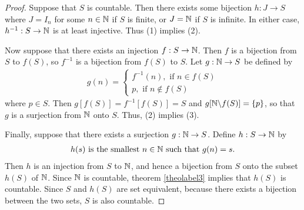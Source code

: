\begin{proof}
	Suppose that $S$ is countable. Then there exists some bijection $h:J\rightarrow S$ where $J=I_n$ for some $n\in \mathbb{N}$ if $S$ is finite, or $J=\mathbb{N}$ if $S$ is infinite. In either case, $h^{-1}:S\rightarrow \mathbb{N}$ is at least injective. Thus (1) implies (2). 
	
	Now suppose that there exists an injection $f:S\rightarrow \mathbb{N}$. Then $f$ is a bijection from $S$ to $f(S)$, so $f^{-1}$ is a bijection from $f(S)$ to $S$. Let $g:\mathbb{N}\rightarrow S$ be defined by
	\begin{align*}
		g(n) = \begin{cases}
			f^{-1}(n), \text{ if $n\in f(S)$} \\
			p, \text{ if $n\notin f(S)$}
		\end{cases}
	\end{align*}
	where $p\in S$. Then $g[f(S)]=f^{-1}[f(S)]=S$ and $g[\mathbb{N}\backslash f(S)]=\{p\}$, so that $g$ is a surjection from $\mathbb{N}$ onto $S$. Thus, (2) implies (3).
	
	Finally, suppose that there exists a surjection $g:\mathbb{N}\rightarrow S$. Define $h:S\rightarrow \mathbb{N}$ by
	\begin{align*}
		h(s) \text{ is the smallest $n\in \mathbb{N}$ such that $g(n)=s$.}
	\end{align*}
	Then $h$ is an injection from $S$ to $\mathbb{N}$, and hence a bijection from $S$ onto the subset $h(S)$ of $\mathbb{N}$. Since $\mathbb{N}$ is countable, theorem \ref{theolabel3} implies that $h(S)$ is countable. Since $S$ and $h(S)$ are set equivalent, because there exists a bijection between the two sets, $S$ is also countable.
\end{proof}















































